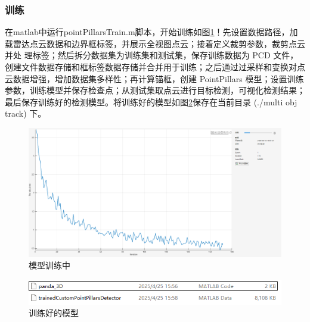 \subsubsection{训练}
在matlab中运行pointPillarsTrain.m脚本，开始训练如图\ref{fig:p30}！先设置数据路径，加载雷达点云数据和边界框标签，并展示全视图点云；接着定义裁剪参数，裁剪点云并处  理标签；然后拆分数据集为训练集和测试集，保存训练数据为 PCD 文件，创建文件数据存储和框标签数据存储并合并用于训练；之后通过过采样和变换对点云数据增强，增加数据集多样性；再计算锚框，创建 PointPillars 模型；设置训练参数，训练模型并保存检查点；从测试集取点云进行目标检测，可视化检测结果；最后保存训练好的检测模型。将训练好的模型如图\ref{fig:p11}保存在当前目录 (./multi obj track) 下。



\begin{figure}[htbp] %
	\centering
	\includegraphics[width=1\textwidth]{p30} %
	\caption{模型训练中} %
	\label{fig:p30} %
\end{figure}








\begin{figure}[htbp] %
	\centering
	\includegraphics[width=1\textwidth]{p11} %
	\caption{训练好的模型} %
	\label{fig:p11} %
\end{figure}






